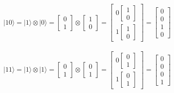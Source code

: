 \documentclass[11pt, fleqn]{article}
\begin{document}
$|10\rangle=|1\rangle \otimes |0\rangle=
\begin{bmatrix}0\\1 \end{bmatrix}\otimes\begin{bmatrix}1\\0 \end{bmatrix}=
\begin{bmatrix}0\begin{bmatrix}1\\0 \end{bmatrix}\\1\begin{bmatrix}1\\0 \end{bmatrix}\end{bmatrix}=
\begin{bmatrix}0\\0\\1\\0 \end{bmatrix}$
\\~\\

$|11\rangle=|1\rangle \otimes |1\rangle=
\begin{bmatrix}0\\1 \end{bmatrix}\otimes\begin{bmatrix}0\\1 \end{bmatrix}=
\begin{bmatrix}0\begin{bmatrix}0\\1 \end{bmatrix}\\1\begin{bmatrix}0\\1 \end{bmatrix}\end{bmatrix}=
\begin{bmatrix}0\\0\\0\\1 \end{bmatrix}$
\\~\\
\end{document}
